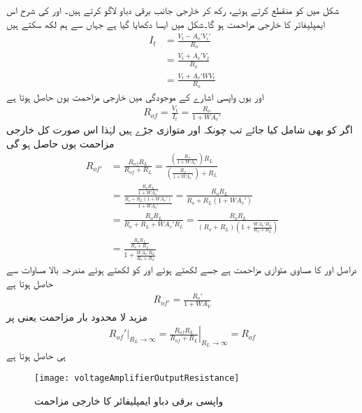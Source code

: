 شکل  میں  کو منقطع کرتے ہوئے،  رکھ  کر خارجی جانب برقی دباو  لاگو کرتے ہیں۔ اور  کی شرح اس ایمپلیفائر کا خارجی مزاحمت  ہو گا۔شکل  میں ایسا دکھایا گیا ہے جہاں سے ہم لکھ سکتے ہیں
\begin{align*}
I_t&=\frac{V_t-A_v' V_i'}{R_o}\\
&=\frac{V_t +A_v' V_f}{R_o} \\
&=\frac{V_t+A_v' W V_t}{R_o}
\end{align*}
اور یوں واپسی اشارے کے موجودگی میں خارجی مزاحمت یوں حاصل ہوتا ہے
\begin{align}
R_{of}=\frac{V_t}{I_t}=\frac{R_o}{1+W A_v'}
\end{align}
اگر  کو بھی شامل کیا جائے تب چونکہ  اور   متوازی جڑے ہیں لہٰذا اس صورت کل خارجی مزاحمت  یوں حاصل ہو گی
\begin{align*}
R_{of'}&=\frac{R_{of} R_L}{R_{of}+R_L}=\frac{\left (\frac{R_o}{1+W A_v'}\right ) R_L} {\left (\frac{R_o}{1+W A_v'} \right )+R_L}\\
&=\frac{\frac{R_o R_L}{1+W A_v'}}{\frac{R_o+R_L \left (1+W A_v' \right )}{1+W A_v'}}=\frac{R_o R_L}{R_o +R_L \left ( 1+W A_v'\right )}\\
&=\frac{R_o R_L}{R_o +R_L + W A_v' R_L}=\frac{R_o R_L}{\left (R_o +R_L \right ) \left (1 + \frac{W A_v' R_L}{R_o+R_L} \right )}\\
&=\frac{\frac{R_o R_L}{R_o+R_L}}{1+\frac{W A_v' R_L}{R_o+R_L}}
\end{align*}
 دراصل  اور  کا مساوی متوازی مزاحمت ہے جسے  لکھتے ہوئے اور  کو  لکھتے ہوئے مندرجہ بالا مساوات سے حاصل ہوتا ہے
\begin{align}
R_{of'}=\frac{R_o'}{1+W A_V}
\end{align}
مزید لا محدود بار مزاحمت یعنی  پر
\begin{align} \label{مساوات_واپسی_لامحدود_بار_مزاحمت__پر_مزاحمت}
\left. R_{of}' \right|_{R_L \to \infty}=\left. \frac{R_{of} R_L}{R_{of}+R_L} \right|_{R_L \to \infty} = R_{of}
\end{align}
ہی حاصل ہوتا ہے
\begin{figure}
\centering
\texttt{[image: voltageAmplifierOutputResistance]}
\caption{واپسی برقی دباو ایمپلیفائر کا خارجی مزاحمت}
\label{شکل_واپسی_برقی_دباو_ایمپلیفائر_خارجی_مزاحمت}
\end{figure}
